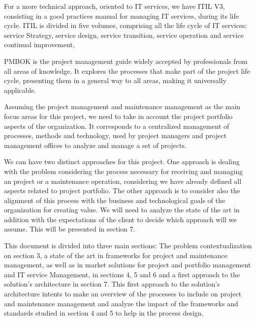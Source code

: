 For a more technical approach, oriented to IT services, we have ITIL V3, consisting in a good practices manual for managing IT services, during its life cycle. ITIL is divided in five volumes, comprising all the life cycle of IT services: service Strategy, service design, service transition, service operation and service continual improvement,\par
PMBOK is the project management guide widely accepted by professionals from all areas of knowledge. It explores the processes that make part of the project life cycle, presenting them in a general way to all areas, making it universally applicable.\par
Assuming the project management and maintenance management as the main focus areas for this project, we need to take in account the project portfolio aspects of the organization. It corresponds to a centralized management of processes, methods and technology, used by project managers and project management offices to analyze and manage a set of projects.\par
We can have two distinct approaches for this project. One approach is dealing with the problem considering the process necessary for receiving and managing an project or a maintenance operation, considering we have already defined all aspects related to project portfolio. The other approach is to consider also the alignment of this process with the business and technological goals of the organization for creating value. We will need to analyze the state of the art in addition with the expectations of the client to decide which approach will we assume. This will be presented in section 7.\par
This document is divided into three main sections: The problem contextualization on section 3, a state of the art in frameworks for project and maintenance management, as well as in market solutions for project and portfolio management and IT service Management, in sections 4, 5 and 6 and a first approach to the solution's architecture in section 7. This first approach to the solution's architecture intents to make an overview of the processes to include on project and maintenance management and analyze the impact of the frameworks and standards studied in section 4 and 5 to help in the process design.